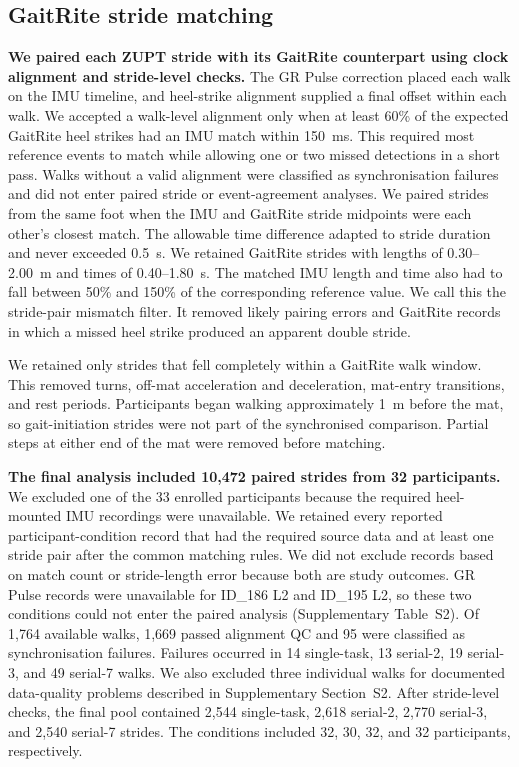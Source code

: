 \documentclass[fleqn,10pt,lineno]{wlpeerj}
\begin{document}
\subsection{GaitRite stride matching}\label{sec:matching}

\textbf{We paired each ZUPT stride with its GaitRite counterpart using clock alignment and stride-level checks.} The GR Pulse correction placed each walk on the IMU timeline, and heel-strike alignment supplied a final offset within each walk. We accepted a walk-level alignment only when at least 60\% of the expected GaitRite heel strikes had an IMU match within 150~ms. This required most reference events to match while allowing one or two missed detections in a short pass. Walks without a valid alignment were classified as synchronisation failures and did not enter paired stride or event-agreement analyses. We paired strides from the same foot when the IMU and GaitRite stride midpoints were each other's closest match. The allowable time difference adapted to stride duration and never exceeded 0.5~s. We retained GaitRite strides with lengths of 0.30--2.00~m and times of 0.40--1.80~s. The matched IMU length and time also had to fall between 50\% and 150\% of the corresponding reference value. We call this the stride-pair mismatch filter. It removed likely pairing errors and GaitRite records in which a missed heel strike produced an apparent double stride.

We retained only strides that fell completely within a GaitRite walk window. This removed turns, off-mat acceleration and deceleration, mat-entry transitions, and rest periods. Participants began walking approximately 1~m before the mat, so gait-initiation strides were not part of the synchronised comparison. Partial steps at either end of the mat were removed before matching.

\textbf{The final analysis included 10{,}472 paired strides from 32 participants.} We excluded one of the 33 enrolled participants because the required heel-mounted IMU recordings were unavailable. We retained every reported participant-condition record that had the required source data and at least one stride pair after the common matching rules. We did not exclude records based on match count or stride-length error because both are study outcomes. GR Pulse records were unavailable for ID\_186 L2 and ID\_195 L2, so these two conditions could not enter the paired analysis (Supplementary Table~S2). Of 1{,}764 available walks, 1{,}669 passed alignment QC and 95 were classified as synchronisation failures. Failures occurred in 14 single-task, 13 serial-2, 19 serial-3, and 49 serial-7 walks. We also excluded three individual walks for documented data-quality problems described in Supplementary Section~S2. After stride-level checks, the final pool contained 2{,}544 single-task, 2{,}618 serial-2, 2{,}770 serial-3, and 2{,}540 serial-7 strides. The conditions included 32, 30, 32, and 32 participants, respectively.
\end{document}
